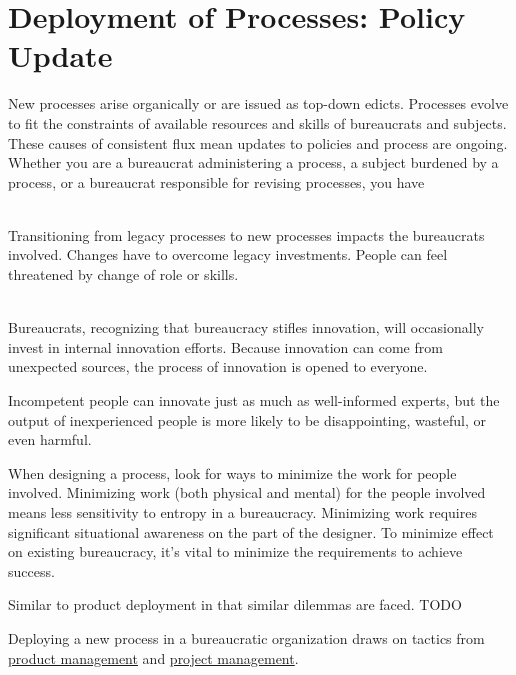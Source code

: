 \section{Deployment of Processes: Policy Update}

New processes arise organically or are issued as top-down edicts. Processes evolve to fit the constraints of available resources and skills of bureaucrats and subjects. These causes of consistent flux mean updates to policies and process are ongoing. Whether you are a bureaucrat administering a process, a subject burdened by a process, or a bureaucrat responsible for revising processes, you have 

\ \\

Transitioning from legacy processes to new processes impacts the bureaucrats involved. Changes have to overcome legacy investments. People can feel threatened by change of role or skills.  

\ \\

Bureaucrats, recognizing that bureaucracy stifles innovation, will occasionally invest in internal innovation efforts. Because innovation can come from unexpected sources, the process of innovation is opened to everyone. 

Incompetent people can innovate just as much as well-informed experts, but the output of inexperienced people is more likely to be disappointing, wasteful, or even harmful. 



When designing a process, look for ways to minimize the work for people involved. Minimizing work (both physical and mental) for the people involved means less sensitivity to entropy in a bureaucracy. Minimizing work requires significant situational awareness on the part of the designer. To minimize effect on existing bureaucracy, it's vital to minimize the requirements to achieve success.


Similar to product deployment in that similar dilemmas are faced.
TODO

Deploying a new process in a bureaucratic organization draws on tactics from 
\href{https://en.wikipedia.org/wiki/Product_management}{product management} and
\href{https://en.wikipedia.org/wiki/Project_management}{project management}. 

